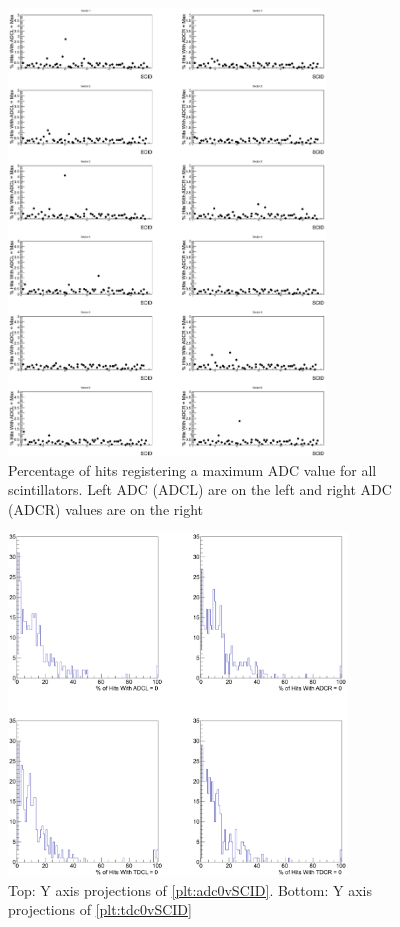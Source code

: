 \begin{figure}\begin{center}
    \includegraphics[width=0.75\textwidth]{figures/calib/tof/tofko/adcMax.eps}
    \caption{\label{plt:adcMvSCID}Percentage of hits registering a maximum ADC value for all scintillators. Left ADC (ADCL) are on the left and right ADC (ADCR) values are on the right}
\end{center}\end{figure}

\begin{figure}\begin{center}
    \includegraphics[width=0.8\textwidth]{figures/calib/tof/tofko/adctdc0perc.eps}
    \caption{\label{plt:proj}Top: Y axis projections of \ref{plt:adc0vSCID}. Bottom: Y axis projections of \ref{plt:tdc0vSCID}}
\end{center}\end{figure}

\FloatBarrier
